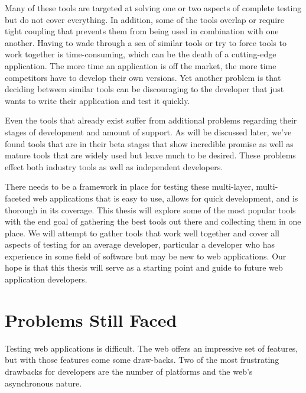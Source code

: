 \documentclass[12pt]{ucthesis}
\begin{document}
Many of these tools are targeted at solving one or two aspects of complete testing but do not cover everything. In addition, some of the tools overlap or require tight coupling that prevents them from being used in combination with one another. Having to wade through a sea of similar tools or try to force tools to work together is time-consuming, which can be the death of a cutting-edge application. The more time an application is off the market, the more time competitors have to develop their own versions. Yet another problem is that deciding between similar tools can be discouraging to the developer that just wants to write their application and test it quickly.

Even the tools that already exist suffer from additional problems regarding their stages of development and amount of support. As will be discussed later, we've found tools that are in their beta stages that show incredible promise as well as mature tools that are widely used but leave much to be desired. These problems effect both industry tools as well as independent developers.

There needs to be a framework in place for testing these multi-layer, multi-faceted web applications that is easy to use, allows for quick development, and is thorough in its coverage. This thesis will explore some of the most popular tools with the end goal of gathering the best tools out there and collecting them in one place. We will attempt to gather tools that work well together and cover all aspects of testing for an average developer, particular a developer who has experience in some field of software but may be new to web applications. Our hope is that this thesis will serve as a starting point and guide to future web application developers.

\section{Problems Still Faced}
Testing web applications is difficult. The web offers an impressive set of features, but with those features come some draw-backs. Two of the most frustrating drawbacks for developers are the number of platforms and the web's asynchronous nature.
\end{document}
